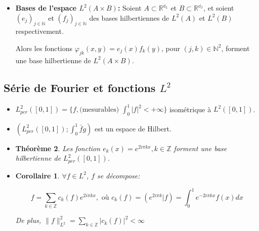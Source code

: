 \documentclass[10pt,a4paper,oneside]{article}
\newtheorem{theoreme}{Théorème}
\newtheorem{corollaire}{Corollaire}
\begin{document}
\begin{itemize}
\begin{theoreme}
\begin{enumerate}
\[ f = \underset{j}{\sum}c_j(f)e_j, \text{ où } c_j(f) = (e_j | f) \in \mathbb{C} \]

De plus, $\| f \|^2 = \underset{j}{\sum}|c_j(f)|^2 < \infty$

\item
Réciproquement, pour des scalaires $\gamma_j$ vérifiant $\sum_j |\gamma_j|^2 < \infty$, la série $\sum_j \gamma_j e_j$ converge dans $H$ et sa somme $f$ vérifie $c_j(f) = \gamma_j$ pour tout $j$

\end{enumerate}
\end{theoreme}

\item
\textbf{Bases de l'espace $L^2(A \times B)$:} Soient $A \subset \mathbb{R^{d_1}}$ et $B \subset \mathbb{R^{d_2}}$, et soient $(e_j)_{j \in \mathbb{N}}$ et $(f_j)_{j \in \mathbb{N}}$ des bases hilbertiennes de $L^2(A)$ et $L^2(B)$ respectivement.

Alors les fonctions $\varphi_{jk}(x,y) = e_j(x) f_k(y)$, pour $(j,k) \in \mathbb{N}^2$, forment une base hilbertienne de $L^2(A \times B)$.

\end{itemize}

\subsection{Série de Fourier et fonctions $L^2$}

\begin{itemize}

\item
$L^2_{per}([0,1]) = \{f, \text{(mesurables) } \int_0^1 |f|^2 < +\infty \}$ isométrique à $L^2([0,1])$.

\item
$(L^2_{per}([0,1]);\int_0^1 \bar{f}g)$ est un espace de Hilbert.

\item
\begin{theoreme}
Les fonction $e_k(x) = e^{2i \pi kx}, k \in \mathbb{Z}$ forment une base hilbertienne de $L^2_{per}([0,1])$.
\end{theoreme}

\item
\begin{corollaire}
$\forall f \in L^2$, $f$ se décompose:

\[ f = \underset{k \in \mathbb{Z}}{\sum} c_k(f) e^{2i \pi kx}, \text{ où } c_k(f) = (e^{2i \pi k}|f) = \int_0^1 e^{-2i \pi kx} f(x) dx \]

De plus, $\| f \|_{L^2}^2 = \underset{k \in \mathbb{Z}}{\sum} |c_k(f)|^2 < \infty$
\end{corollaire}

\end{itemize}
\end{document}
